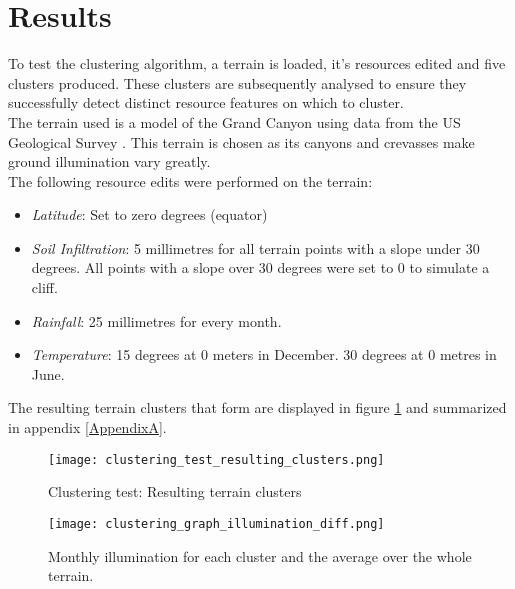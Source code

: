 \section{Results}

To test the clustering algorithm, a terrain is loaded, it's resources edited and five clusters produced. These clusters are subsequently analysed to ensure they successfully detect distinct resource features on which to cluster.\\

The terrain used is a model of the Grand Canyon using data from the US Geological Survey \protect\footnotemark {}. This terrain is chosen as its canyons and crevasses make ground illumination vary greatly.\\

The following resource edits were performed on the terrain:

\begin{itemize}
\item \textit{Latitude}: Set to zero degrees (equator)
\item \textit{Soil Infiltration}: 5 millimetres for all terrain points with a slope under 30 degrees. All points with a slope over 30 degrees were set to 0 to simulate a cliff.
\item \textit{Rainfall}: 25 millimetres for every month.
\item \textit{Temperature}: 15 degrees at 0 meters in December. 30 degrees at 0 metres in June. 
\end{itemize}

The resulting terrain clusters that form are displayed in figure \ref{fig:clustering_test_resulting_clusters} and summarized in appendix \ref{AppendixA}.

\begin{figure}
\center
	\texttt{[image: clustering\_test\_resulting\_clusters.png]}
	\caption{ Clustering test: Resulting terrain clusters}	
	\label{fig:clustering_test_resulting_clusters}
\end{figure}


\begin{figure}
\center
	\texttt{[image: clustering\_graph\_illumination\_diff.png]}
	\caption{ Monthly illumination for each cluster and the average over the whole terrain.}	
	\label{fig:clustering_graph_illumination}
\end{figure}

